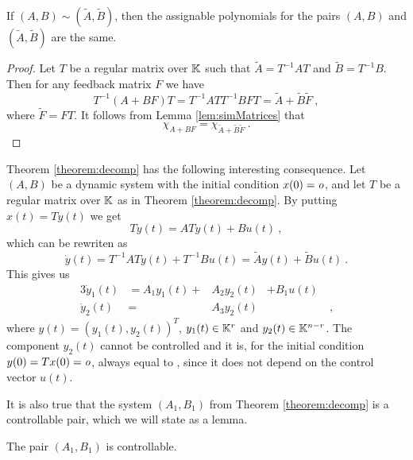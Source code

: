 \begin{lemma}
	\label{lem:simPairsAssignablePolynomial}
	If $(A,B)\sim(\widetilde{A},\widetilde{B})$, then the assignable polynomials for the pairs $(A,B)$ and $(\widetilde{A},\widetilde{B})$ are the same.
\end{lemma}

\begin{proof}
	Let $T$ be a regular matrix over $\mathbb{K}$ such that $\widetilde{A}=T^{-1}AT$ and $\widetilde{B}=T^{-1}B$. Then for any feedback matrix $F$ we have 
	$$T^{-1}(A+BF)T=T^{-1}ATT^{-1}BFT=\widetilde{A}+\widetilde{B}\widetilde{F}\ ,$$
	where $\widetilde{F}=FT$. It follows from Lemma \ref{lem:simMatrices} that $$\chi_{A+BF}=\chi_{\widetilde{A}+\widetilde{B}\widetilde{F}}\ .$$
\end{proof}

Theorem \ref{theorem:decomp} has the following interesting consequence. Let $(A,B)$ be a dynamic system with the initial condition $x(0)=\textit{o}$, and let $T$ be a regular matrix over $\mathbb{K}$ as in Theorem \ref{theorem:decomp}. By putting $x(t)=Ty(t)$ we get 
$$T\dot{y}(t)=ATy(t)+Bu(t)\ ,$$ 
which can be rewriten as 
$$\dot{y}(t)=T^{-1}ATy(t)+T^{-1}Bu(t)=\widetilde{A}y(t)+\widetilde{B}u(t)\ .$$ 
This gives us 
\begin{alignat*}{3}
	\dot{y}_1(t)&=A_1y_1(t)+&A_2y_2(t)&+B_1u(t)& \\
	\dot{y}_2(t)&=&A_3y_2(t)&&\ ,
\end{alignat*}
where $y(t)=(y_1(t),y_2(t))^T$, $y_1(t)\in\mathbb{K}^r$ and $y_2(t)\in\mathbb{K}^{n-r}$. The component $y_2(t)$ cannot be controlled and it is, for the initial condition $y(0)=Tx(0)=\textit{o}$, always equal to \nullvector, since it does not depend on the control vector $u(t)$. 

It is also true that the system $(A_1,B_1)$ from Theorem \ref{theorem:decomp} is a controllable pair, which we will state as a lemma.

\begin{lemma}
	\label{lem:A_1B_1controllable}
	The pair $(A_1,B_1)$ is controllable.
\end{lemma}

